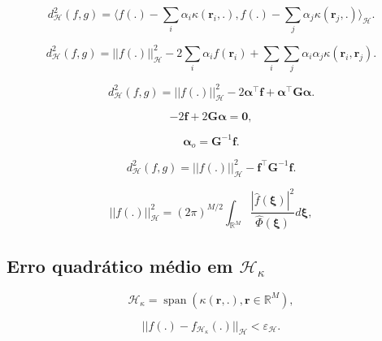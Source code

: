 \begin{equation}
    d^2_\mathcal{H}(f,g) = \langle f(.) - \sum_{i}\alpha_i \kappa(\mathbf{r}_i,.), f(.) - \sum_{j}\alpha_j \kappa(\mathbf{r}_j,.) \rangle_{\mathcal{H}}.
\end{equation}

\begin{equation}
    d^2_\mathcal{H}(f,g) = ||f(.)||^2_\mathcal{H} - 2\sum_{i}\alpha_i f(\mathbf{r}_i)   +\sum_i\sum_{j}\alpha_i\alpha_j \kappa(\mathbf{r}_i,\mathbf{r}_j).
\end{equation}

\begin{equation}
    d^2_\mathcal{H}(f,g) = ||f(.)||^2_\mathcal{H} -2\boldsymbol{\alpha}^\top \mathbf{f} + \boldsymbol{\alpha}^\top\mathbf{G}\boldsymbol{\alpha}.\label{eq:matrix_d2H}
\end{equation}

\begin{equation}
    -2\mathbf{f} + 2\mathbf{G}\boldsymbol{\alpha} = \mathbf{0},
\end{equation}

\begin{equation}
    \boldsymbol{\alpha}_o = \mathbf{G}^{-1}\mathbf{f}.\label{eq:alpha_o}
\end{equation}

\begin{equation}
    d^2_\mathcal{H}(f,g) = ||f(.)||^2_\mathcal{H} -\mathbf{f}^\top\mathbf{G}^{-1}\mathbf{f}.
\end{equation}

\begin{equation}
    ||f(.)||_\mathcal{H}^2 = (2\pi)^{M/2}\int_{\mathbb{R}^{M}}\frac{|\hat{f}(\boldsymbol{\xi})|^2}{\hat{\Phi}(\boldsymbol{\xi})}d\boldsymbol{\xi},
\end{equation} 

\subsection{Erro quadrático médio em $\mathcal{H}_\kappa$}

\begin{equation}
    \mathcal{H}_{\kappa} = \operatorname{span}(\kappa(\mathbf{r},.), \mathbf{r} \in \mathbb{R}^M),
\end{equation}

\begin{equation}
||f(.) - f_{\mathcal{H}_{\kappa}}(.)||_\mathcal{H} < \varepsilon_\mathcal{H}.    
\end{equation}

